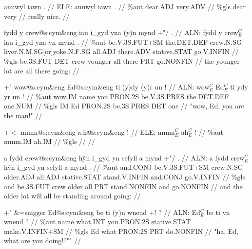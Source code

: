 \documentclass[a4paper,10pt]{article}
\begin{document}
\ex
\begingl[lingstyle=gergl]
\glchat annwyl iawn . //
\glsurface ELE:  annwyl iawn .  //
\glauto \%aut  dear{\scriptsize .ADJ} very{\scriptsize .ADV}   //
\glmanual \%gls  dear very   //
\gleng really nice. //
\endgl
\xe

\ex
\begingl[lingstyle=gergl]
\glchat fydd y crew@s:cym\&eng iau i\_gyd yna (y)n mynd +"/ . //
\glsurface ALN:  fydd y crew$^{C}_{E}$ iau i\_gyd yna yn mynd .  //
\glauto \%aut  be{\scriptsize .V.3S.FUT+SM} the{\scriptsize .DET.DEF} crew{\scriptsize .N.SG} liver{\scriptsize .N.M.SG[or]yoke.N.F.SG} all{\scriptsize .ADJ} there{\scriptsize .ADV} stative{\scriptsize .STAT} go{\scriptsize .V.INFIN}   //
\glmanual \%gls  be{\scriptsize .3S.FUT} DET crew younger all there PRT go{\scriptsize .NONFIN}   //
\gleng the younger lot are all there going: //
\endgl
\xe

\ex
\begingl[lingstyle=gergl]
\glchat +" wow@s:cym\&eng Ed@s:cym\&eng ti (y)dy (y)r un ! //
\glsurface ALN:  wow$^{C}_{E}$ Ed$^{C}_{E}$ ti ydy yr un !  //
\glauto \%aut  wow{\scriptsize .IM} name you{\scriptsize .PRON.2S} be{\scriptsize .V.3S.PRES} the{\scriptsize .DET.DEF} one{\scriptsize .NUM}   //
\glmanual \%gls  IM Ed PRON{\scriptsize .2S} be{\scriptsize .3S.PRES} DET one   //
\gleng "wow, Ed, you are the man!" //
\endgl
\xe

\ex
\begingl[lingstyle=gergl]
\glchat +$<$ mmm@s:cym\&eng a:h@s:cym\&eng ! //
\glsurface ELE:  mmm$^{C}_{E}$ ah$^{C}_{E}$ !  //
\glauto \%aut  mmm{\scriptsize .IM} ah{\scriptsize .IM}   //
\glmanual \%gls      //
\gleng  //
\endgl
\xe

\ex
\begingl[lingstyle=gergl]
\glchat a fydd crew@s:cym\&eng hŷn i\_gyd yn sefyll a mynd +"/ . //
\glsurface ALN:  a fydd crew$^{C}_{E}$ hŷn i\_gyd yn sefyll a mynd .  //
\glauto \%aut  and{\scriptsize .CONJ} be{\scriptsize .V.3S.FUT+SM} crew{\scriptsize .N.SG} older{\scriptsize .ADJ} all{\scriptsize .ADJ} stative{\scriptsize .STAT} stand{\scriptsize .V.INFIN} and{\scriptsize .CONJ} go{\scriptsize .V.INFIN}   //
\glmanual \%gls  and be{\scriptsize .3S.FUT} crew older all PRT stand{\scriptsize .NONFIN} and go{\scriptsize .NONFIN}   //
\gleng and the older lot will all be standing around going: //
\endgl
\xe

\ex
\begingl[lingstyle=gergl]
\glchat +" \&=snigger Ed@s:cym\&eng be ti (y)n wneud +! ? //
\glsurface ALN:  Ed$^{C}_{E}$ be ti yn wneud ?  //
\glauto \%aut  name what{\scriptsize .INT} you{\scriptsize .PRON.2S} stative{\scriptsize .STAT} make{\scriptsize .V.INFIN+SM}   //
\glmanual \%gls  Ed what PRON{\scriptsize .2S} PRT do{\scriptsize .NONFIN}   //
\gleng "ha, Ed, what are you doing!?"" //
\endgl
\xe
\end{document}
